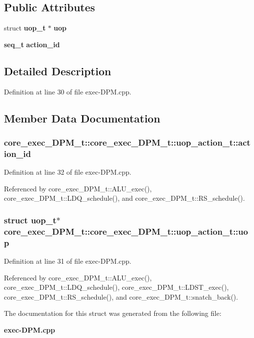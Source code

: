 \subsection*{Public Attributes}
\begin{CompactItemize}
\item 
struct {\bf uop\_\-t} $\ast$ {\bf uop}
\item 
{\bf seq\_\-t} {\bf action\_\-id}
\end{CompactItemize}


\subsection{Detailed Description}


Definition at line 30 of file exec-DPM.cpp.

\subsection{Member Data Documentation}
\subsubsection[{action\_\-id}]{ core\_\-exec\_\-DPM\_\-t::core\_\-exec\_\-DPM\_\-t::uop\_\-action\_\-t::action\_\-id}\label{structcore__exec__DPM__t_1_1uop__action__t_0adcd9ccf128d31dd9c5b3f122a63010}




Definition at line 32 of file exec-DPM.cpp.

Referenced by core\_\-exec\_\-DPM\_\-t::ALU\_\-exec(), core\_\-exec\_\-DPM\_\-t::LDQ\_\-schedule(), and core\_\-exec\_\-DPM\_\-t::RS\_\-schedule().
\subsubsection[{uop}]{\setlength{\rightskip}{0pt plus 5cm}struct {\bf uop\_\-t}$\ast$ core\_\-exec\_\-DPM\_\-t::core\_\-exec\_\-DPM\_\-t::uop\_\-action\_\-t::uop\hspace{0.3cm}{\tt  [read]}}\label{structcore__exec__DPM__t_1_1uop__action__t_9371fd63194ec02ca9e654a39a46209c}




Definition at line 31 of file exec-DPM.cpp.

Referenced by core\_\-exec\_\-DPM\_\-t::ALU\_\-exec(), core\_\-exec\_\-DPM\_\-t::LDQ\_\-schedule(), core\_\-exec\_\-DPM\_\-t::LDST\_\-exec(), core\_\-exec\_\-DPM\_\-t::RS\_\-schedule(), and core\_\-exec\_\-DPM\_\-t::snatch\_\-back().

The documentation for this struct was generated from the following file:\begin{CompactItemize}
\item 
{\bf exec-DPM.cpp}\end{CompactItemize}
